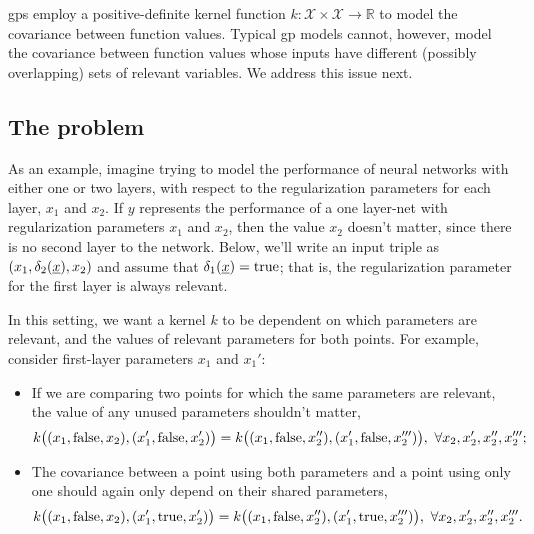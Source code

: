 \documentclass{article}
\newcommand{\vect}[1]{\underline{\smash{#1}}}
\renewcommand{\v}[1]{\vect{#1}}
\newcommand{\sX}{\mathcal{X}}
\newcommand{\gp}{{\sc gp}}
\begin{document}
\gp{}s employ a positive-definite kernel function $k: \sX \times \sX \rightarrow \mathbb{R}$ to model the covariance between function values. Typical \gp{} models cannot, however, model the covariance between function values whose inputs have different (possibly overlapping) sets of relevant variables. We address this issue next.

\subsection{The problem}
\vspace{-0.05in}

As an example, imagine trying to model the performance of neural networks with either one or two layers, with respect to the regularization parameters for each layer, $x_1$ and $x_2$.  If $y$ represents the performance of a one layer-net with regularization parameters $x_1$ and $x_2$, then the value $x_2$ doesn't matter, since there is no second layer to the network. Below, we'll write an input triple as $(x_1, \delta_2(\v{x}), x_2)$ and assume that $\delta_1(\v{x}) = \text{true}$; that is, the regularization parameter for the first layer is always relevant. 

In this setting, we want a kernel $k$ to be dependent on which parameters are relevant, and the values of relevant parameters for both points. For example, consider first-layer parameters $x_1$ and $x_1'$:
%
\begin{itemize}[leftmargin=0.8cm]
\item If we are comparing two points for which the same parameters are relevant, the value of any unused parameters shouldn't matter,  
\begin{equation}
 k\bigl((x_1, \textnormal{false}, x_2), (x_1', \textnormal{false}, x_2') \bigr)
= k\bigl((x_1, \textnormal{false}, x_2''), (x_1', \textnormal{false}, x_2''')\bigr),\ 
\forall x_2, x_2', x_2'', x_2''';
\end{equation}
\item The covariance between a point using both parameters and a point using only one should again only depend on their shared parameters,
\begin{equation}
 k\bigl((x_1, \textnormal{false}, x_2), (x_1', \textnormal{true}, x_2') \bigr)
= k\bigl((x_1, \textnormal{false}, x_2''), (x_1', \textnormal{true}, x_2''')\bigr),\ 
\forall x_2, x_2', x_2'', x_2'''.
\end{equation}
\end{itemize}
\end{document}
